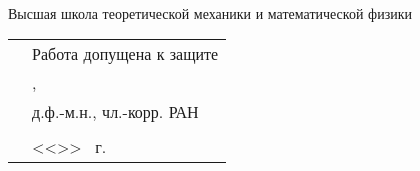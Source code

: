 \thispagestyle{empty}%
\makeatletter
{}
%
\makeatother



{\centering%
	\Ministry\\
	\SPbPU\\
	{%
		\institute\\
		Высшая школа теоретической механики и математической физики}
\par}%


\vspace{0pt plus1fill} %
\vspace*{5mm}

\noindent
\begin{minipage}{\linewidth}
	\vspace{\mfloatsep} %
	\begin{tabularx}{\linewidth}{Xl}
	&Работа допущена к защите     \\
	&\HeadTitle,     \\		
	&д.ф.-м.н., чл.-корр. РАН \\	
	&\underline{\hspace*{0.1\textheight}} \Head     \\
	&<<\underline{\hspace*{0.05\textheight}}>> \underline{\hspace*{0.1\textheight}} \thesisYear~г.  \\ 
	\end{tabularx}
	\vspace{\mfloatsep} %
\end{minipage}


\vspace{0pt plus2fill} %
\vspace*{7mm}

